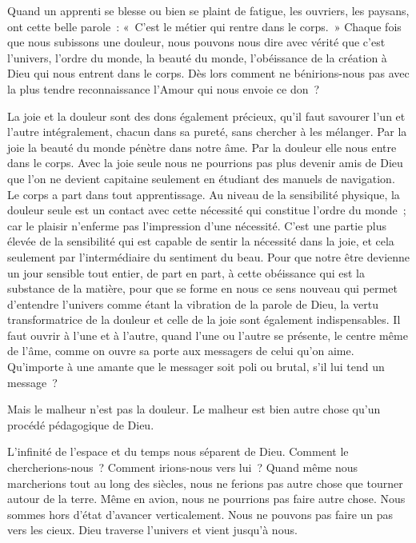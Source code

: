 \documentclass[french,twoside]{book} %
\begin{document}
Quand un apprenti se blesse ou bien se plaint de fatigue, les ouvriers, les paysans, ont cette belle parole : « C'est le métier qui rentre dans le corps. » Chaque fois que nous subissons une douleur, nous pouvons nous dire avec vérité que c'est l'univers, l'ordre du monde, la beauté du monde, l'obéissance de la création à Dieu qui nous entrent dans le corps. Dès lors comment ne bénirions-nous pas avec la plus tendre reconnaissance l'Amour qui nous envoie ce don ?\par
La joie et la douleur sont des dons également précieux, qu'il faut savourer l'un et l'autre intégralement, chacun dans sa pureté, sans chercher à les mélanger. Par la joie la beauté du monde pénètre dans notre âme. Par la douleur elle nous entre dans le corps. Avec la joie seule nous ne pourrions pas plus devenir amis de Dieu que l'on ne devient capitaine seulement en étudiant des manuels de navigation. Le corps a part dans tout apprentissage. Au niveau de la sensibilité physique, la douleur seule est un contact avec cette nécessité qui constitue l'ordre du monde ; car le plaisir n'enferme pas l'impression d'une nécessité. C'est une partie plus élevée de la sensibilité qui est capable de sentir la nécessité dans la joie, et cela seulement par l'intermédiaire du sentiment du beau. Pour que notre être devienne un jour sensible tout entier, de part en part, à cette obéissance qui est la substance de la matière, pour que se forme en nous ce sens nouveau qui permet d'entendre l'univers comme étant la vibration de la parole de Dieu, la vertu transformatrice de la douleur et celle de la joie sont également indispensables. Il faut ouvrir à l'une et à l'autre, quand l'une ou l'autre se présente, le centre même de l'âme, comme on ouvre sa porte aux messagers de celui qu'on aime. Qu'importe à une amante que le messager soit poli ou brutal, s'il lui tend un message ?\par
Mais le malheur n'est pas la douleur. Le malheur est bien autre chose qu'un procédé pédagogique de Dieu.\par
L'infinité de l'espace et du temps nous séparent de Dieu. Comment le chercherions-nous ? Comment irions-nous vers lui ? Quand même nous marcherions tout au long des siècles, nous ne ferions pas autre chose que tourner autour de la terre. Même en avion, nous ne pourrions pas faire autre chose. Nous sommes hors d'état d'avancer verticalement. Nous ne pouvons pas faire un pas vers les cieux. Dieu traverse l'univers et vient jusqu'à nous.\par
\end{document}
